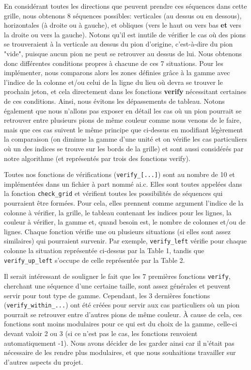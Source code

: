 \documentclass[a4paper, 11pt, oneside]{article}
\begin{document}
En considérant toutes les directions que peuvent prendre ces séquences dans cette grille, nous obtenons 8 séquences possibles: verticales (au dessus ou en dessous), horizontales (à droite ou à gauche), et obliques (vers le haut ou vers bas \textbf{et} vers la droite ou vers la gauche). Notons qu'il est inutile de vérifier le cas où des pions se trouveraient à la verticale au dessus du pion d'origine, c'est-à-dire du pion "vide", puisque aucun pion ne peut se retrouver au dessus de lui. Nous obtenons donc différentes conditions propres à chacune de ces 7 situations. Pour les implémenter, nous comparons alors les zones définies grâce à la gamme avec l'indice de la colonne et/ou celui de la ligne du lieu où devra se trouver le prochain jeton, et cela directement dans les fonctions \textbf{verify} nécessitant certaines de ces conditions. Ainsi, nous évitons les dépassements de tableau. Notons également que nous n'allons pas exposer en détail les cas où un pion pourrait se retrouver entre plusieurs pions de même couleur comme nous venons de le faire, mais que ces cas suivent le même principe que ci-dessus en modifiant légèrement la comparaison (on diminue la gamme d'une unité et on vérifie les cas particuliers où un des indices se trouve sur les bords de la grille) et sont aussi considérés par notre algorithme (et représentés par trois des fonctions verify).

Toutes nos fonctions de vérifications (\texttt{verify\_[...]}) sont au nombre de 10 et implémentées dans un fichier à part nommé ai.c. Elles sont toutes appelées dans la fonction \texttt{check\_grid} et vérifient toutes les possibilités de séquences qui pourraient être formées. Pour cela, elles prennent comme argument l'indice de la colonne à vérifier, la grille, le tableau contenant les indices pour les lignes, la couleur à vérifier, la gamme et, quand besoin est, le nombre de colonnes et/ou de lignes. Chaque fonction vérifie une ou plusieurs situations (si elles sont assez similaires)  qui pourraient survenir. Par exemple, \texttt{verify\_left} vérifie pour chaque colonne la situation représentée ci-dessus par la Table 1, tandis que \texttt{verify\_up\_left} s'occupe de celle représentée par la Table 2.

Il serait intéressant de souligner le fait que les 7 premières fonctions \texttt{verify}, cherchant une séquence d'une certaine taille, sont assez générales et peuvent servir pour tout type de gamme. Cependant, les 3 dernières fonctions (\texttt{verify\_within\_...}) ont été créées pour servir aux cas particuliers où un pion pourrait se retrouver entre d'autres pions de même couleur. À cause de cela, ces fonctions sont moins modulaires pour ce qui est du choix de la gamme, celle-ci devant valoir 2 ou 3 (si ce n'est pas le cas, les fonctions renvoient automatiquement -1). Nous avons décider de les garder ainsi car il n'était pas nécessaire de les rendre plus modulaires, et que nous souhaitions travailler sur d'autres aspects du projet.
\end{document}
